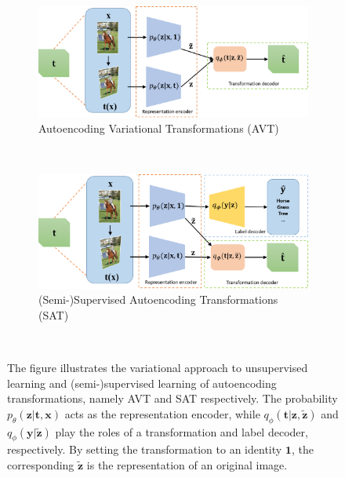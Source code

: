 \documentclass[10pt,journal,compsoc,twoside]{IEEEtran}
\begin{document}
\begin{figure}[t]
    \centering
    \begin{subfigure}[c]{0.49\textwidth}
        \includegraphics[width=\textwidth]{Figures/AVT.png}
        \caption{Autoencoding Variational Transformations (AVT)}
    \end{subfigure}
    ~ %
    \begin{subfigure}[c]{0.49\textwidth}
        \includegraphics[width=\textwidth]{Figures/vSAT.png}
        \caption{(Semi-)Supervised Autoencoding Transformations (SAT)}
    \end{subfigure}\\
    \caption{The figure illustrates the variational approach to unsupervised learning and (semi-)supervised learning of autoencoding transformations, namely AVT and SAT respectively. The probability $p_\theta(\mathbf z|\mathbf t,\mathbf x)$ acts as the representation encoder, while $q_\phi(\mathbf t|\mathbf z,\mathbf {\tilde z})$ and $q_\phi(\mathbf y|\mathbf {\tilde z})$ play the roles of a transformation and label decoder, respectively. By setting the transformation to an identity $\mathbf 1$, the corresponding $\tilde{\mathbf z}$ is the representation of an original image.}\label{fig:variational}
\end{figure}
\end{document}
